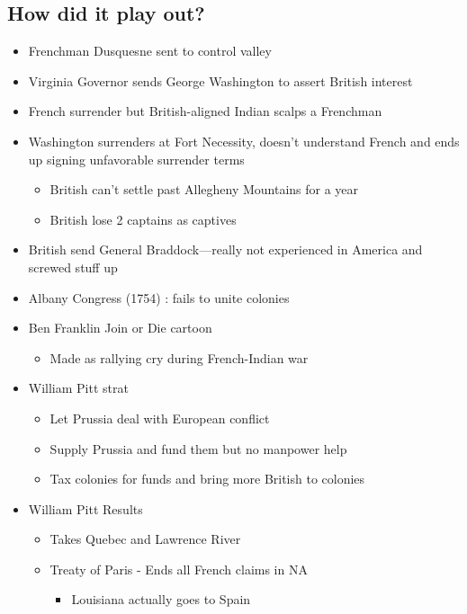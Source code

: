 \documentclass[letterpaper]{article}
\begin{document}
\subsection{How did it play out?}
\label{sec:org2dc1a14}
\begin{itemize}
\item Frenchman Dusquesne sent to control valley
\item Virginia Governor sends George Washington to assert British interest
\item French surrender but British-aligned Indian scalps a Frenchman
\item Washington surrenders at Fort Necessity, doesn't understand French and ends up signing unfavorable surrender terms
\begin{itemize}
\item British can't settle past Allegheny Mountains for a year
\item British lose 2 captains as captives
\end{itemize}
\item British send General Braddock—really not experienced in America and screwed stuff up
\item Albany Congress (1754) : fails to unite colonies
\item Ben Franklin Join or Die cartoon
\begin{itemize}
\item Made as rallying cry during French-Indian war
\end{itemize}
\item William Pitt strat
\begin{itemize}
\item Let Prussia deal with European conflict
\item Supply Prussia and fund them but no manpower help
\item Tax colonies for funds and bring more British to colonies
\end{itemize}
\item William Pitt Results
\begin{itemize}
\item Takes Quebec and Lawrence River
\item Treaty of Paris - Ends all French claims in NA
\begin{itemize}
\item Louisiana actually goes to Spain
\end{itemize}
\end{itemize}
\end{itemize}
\end{document}
